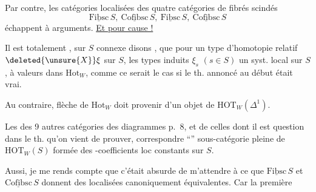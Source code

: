 Par contre, les catégories localisées des quatre catégories de fibrés scindés
\[
 \underline{\mathrm{Fibsc}}\,S,\ \underline{\mathrm{Cofibsc}}\,S,\ \underline{\mathrm{Fibsc}}\,S,\ \underline{\mathrm{Cofibsc}}\,S
\]
échappent à  arguments. \uline{Et pour cause !}

Il est totalement , sur $S$ connexe disons , que  pour un type d'homotopie relatif $\deleted{\unsure{X}}\xi$ sur $S$, les types induits  $\xi_s$ $(s\in S)$  un syst. local sur $S$, à valeurs dans $\mathrm{Hot}_W$, comme ce serait le cas si le th. annoncé au début était vrai.

Au contraire, \uline{} flèche de $\mathrm{Hot}_W$ doit provenir d'un objet de $\mathrm{HOT}_W(\Delta^1)$.

Les  des 9 autres catégories des diagrammes p.~8, et de  celles dont il est question dans le th. qu'on vient de prouver,  correspondre ``''  sous-catégorie pleine de $\mathrm{HOT}_W(S)$ formée des -coefficients loc constants sur $S$.

Aussi, je me rends compte que c'était absurde de m'attendre à ce que $\underline{\mathrm{Fibsc}}\,S$ et $\underline{\mathrm{Cofibsc}}\,S$ donnent des  localisées canoniquement équivalentes. Car  la première
